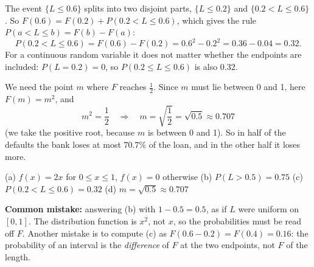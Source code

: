 \begin{solution}
	 The event $\{L\le0.6\}$ splits into two disjoint parts,
	$\{L\le0.2\}$ and $\{0.2<L\le0.6\}$. So $F(0.6)=F(0.2)+P(0.2<L\le0.6)$,
	which gives the rule $P(a<L\le b)=F(b)-F(a)$:
	\[ P(0.2<L\le0.6)=F(0.6)-F(0.2)=0.6^2-0.2^2=0.36-0.04=0.32. \]
	For a continuous random variable it does not matter whether the endpoints
	are included: $P(L=0.2)=0$, so $P(0.2\le L\le0.6)$ is also $0.32$.

	 We need the point $m$ where $F$ reaches $\frac12$. Since $m$
	must lie between 0 and 1, here $F(m)=m^2$, and
	\[ m^2=\frac12 \quad\Longrightarrow\quad m=\sqrt{\frac12}=\sqrt{0.5}\approx0.707 \]
	(we take the positive root, because $m$ is between 0 and 1). So in half of
	the defaults the bank loses at most $70.7\%$ of the loan, and in the other
	half it loses more.
	\begin{answer}
		(a) $f(x)=2x$ for $0\le x\le1$, $f(x)=0$ otherwise
		\quad (b) $P(L>0.5)=0.75$
		\quad (c) $P(0.2<L\le0.6)=0.32$
		\quad (d) $m=\sqrt{0.5}\approx0.707$
	\end{answer}
	\begin{remark}
		\textbf{Common mistake:} answering (b) with $1-0.5=0.5$, as if $L$ were
		uniform on $[0,1]$. The distribution function is $x^2$, not $x$, so
		the probabilities must be read off $F$. Another mistake is to compute
		(c) as $F(0.6-0.2)=F(0.4)=0.16$: the probability of an interval is the
		\emph{difference} of $F$ at the two endpoints, not $F$ of the length.
	\end{remark}
\end{solution}
